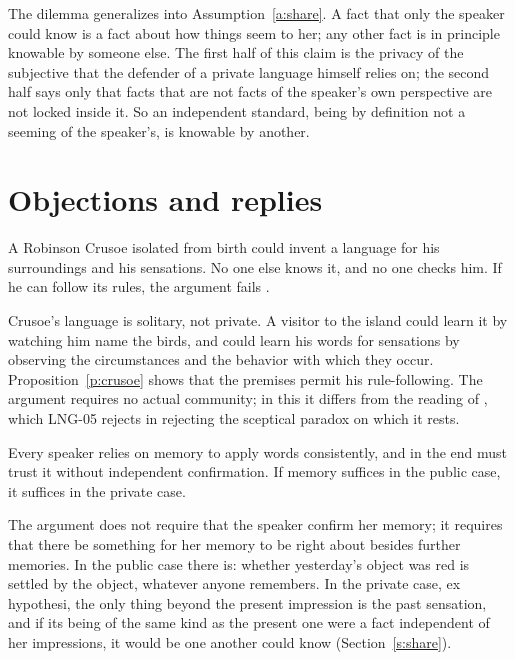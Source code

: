 \documentclass{situationist-preprint}
\begin{document}
The dilemma generalizes into Assumption~\ref{a:share}. A fact that only the speaker could know is a fact about how things seem to her; any other fact is in principle knowable by someone else. The first half of this claim is the privacy of the subjective that the defender of a private language himself relies on; the second half says only that facts that are not facts of the speaker's own perspective are not locked inside it. So an independent standard, being by definition not a seeming of the speaker's, is knowable by another.

\section{Objections and replies}

\begin{objection}[Crusoe]
A Robinson Crusoe isolated from birth could invent a language for his surroundings and his sensations. No one else knows it, and no one checks him. If he can follow its rules, the argument fails \citep{Ayer1954}.
\end{objection}

\begin{reply}
Crusoe's language is solitary, not private. A visitor to the island could learn it by watching him name the birds, and could learn his words for sensations by observing the circumstances and the behavior with which they occur. Proposition~\ref{p:crusoe} shows that the premises permit his rule-following. The argument requires no actual community; in this it differs from the reading of \citet{Kripke1982}, which LNG-05 rejects in rejecting the sceptical paradox on which it rests.
\end{reply}

\begin{objection}[Memory]
Every speaker relies on memory to apply words consistently, and in the end must trust it without independent confirmation. If memory suffices in the public case, it suffices in the private case.
\end{objection}

\begin{reply}
The argument does not require that the speaker confirm her memory; it requires that there be something for her memory to be right about besides further memories. In the public case there is: whether yesterday's object was red is settled by the object, whatever anyone remembers. In the private case, ex hypothesi, the only thing beyond the present impression is the past sensation, and if its being of the same kind as the present one were a fact independent of her impressions, it would be one another could know (Section~\ref{s:share}).
\end{reply}
\end{document}
